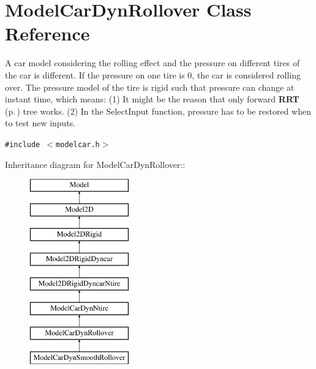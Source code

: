 \section{Model\-Car\-Dyn\-Rollover  Class Reference}
\label{classModelCarDynRollover}
A car model considering the rolling effect and the pressure on different tires of the car is different. If the pressure on one tire is 0, the car is considered rolling over. The pressure model of the tire is rigid such that pressure can change at instant time, which means: (1) It might be the reason that only forward {\bf RRT} {\rm (p.\,\pageref{classRRT})} tree works. (2) In the Select\-Input function, pressure has to be restored when to test new inputs. 


{\tt \#include $<$modelcar.h$>$}

Inheritance diagram for Model\-Car\-Dyn\-Rollover::\begin{figure}[H]
\begin{center}
\leavevmode
\includegraphics[height=8cm]{classModelCarDynRollover}
\end{center}
\end{figure}
